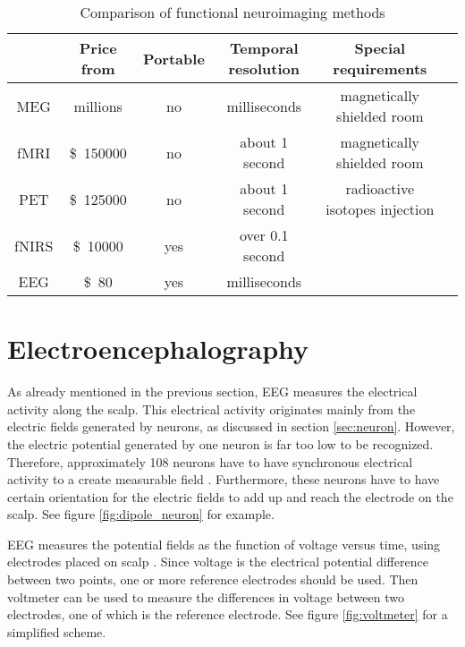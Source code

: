 
\begin{table}[h]
	\centering
	\begin{tabular}{|c|c|c|c|c|c|}\hline
			& Price	from				& Portable	& Temporal resolution		& Special requirements			\\\hline
\gls{MEG}	& millions\pMEG				& no		& milliseconds \tresol		& magnetically shielded room	\\\hline
\gls{fMRI}	& \SI{150000}[\$]\pfMRI		& no		& about 1 second \tresol	& magnetically shielded room	\\\hline
\gls{PET}	& \SI{125000}[\$]\pPET		& no		& about 1 second \tresol	& radioactive isotopes injection\\\hline
\gls{fNIRS}	& \SI{10000}[\$]{} \pNIRS	& yes		& over 0.1 second \pNIRS	&								\\\hline
\gls{EEG}	& \SI{80}[\$]\pEEG			& yes		& milliseconds \tresol		&								\\\hline
	\end{tabular}
	\caption{Comparison of functional neuroimaging methods}
	\label{tab:neuroimaging}
\end{table}

\section{Electroencephalography}
\label{sec:EEG}

As already mentioned in the previous section, \gls{EEG} measures the electrical activity along the scalp. This electrical activity originates mainly from the electric fields generated by neurons, as discussed in section \ref{sec:neuron}. However, the electric potential generated by one neuron is far too low to be recognized. Therefore, approximately 108 neurons have to have synchronous electrical activity to a create measurable field \cite{field_count}. Furthermore, these neurons have to have certain orientation for the electric fields to add up and reach the electrode on the scalp. See figure \ref{fig:dipole_neuron} for example.

\gls{EEG} measures the potential fields as the function of voltage versus time, using electrodes placed on scalp \cite{field_count}. Since voltage is the electrical potential difference between two points, one or more reference electrodes should be used. Then voltmeter can be used to measure the differences in voltage between two electrodes, one of which is the reference electrode. See figure \ref{fig:voltmeter} for a simplified scheme.

